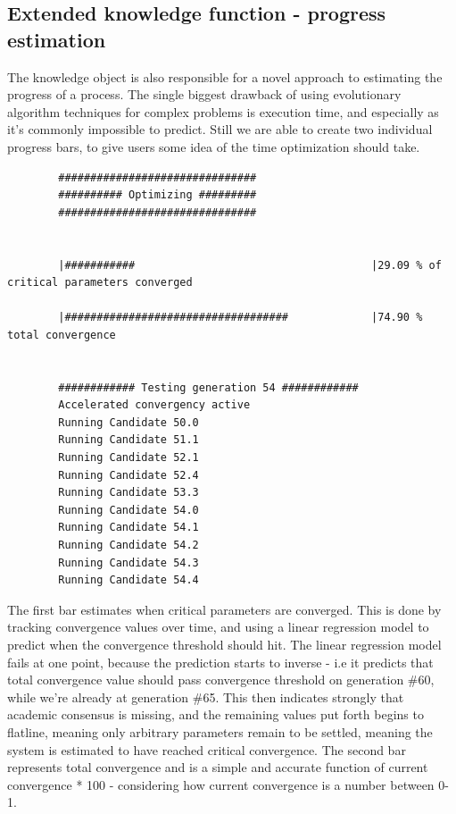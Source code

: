 \documentclass[a4paper,english]{report}
\begin{document}
		\subsection{Extended knowledge function - progress estimation}
		The knowledge object is also responsible for a novel approach to estimating the progress of a process. The single biggest drawback of using evolutionary algorithm techniques for complex problems is execution time, and especially as it's commonly impossible to predict. Still we are able to create two individual progress bars, to give users some idea of the time optimization should take.
		\scriptsize
		\begin{verbatim}
		###############################
		########## Optimizing #########
		###############################
		
		
		|###########                                     |29.09 % of critical parameters converged
		
		|###################################             |74.90 % total convergence
		
		
		############ Testing generation 54 ############
		Accelerated convergency active
		Running Candidate 50.0
		Running Candidate 51.1
		Running Candidate 52.1
		Running Candidate 52.4
		Running Candidate 53.3
		Running Candidate 54.0
		Running Candidate 54.1
		Running Candidate 54.2
		Running Candidate 54.3
		Running Candidate 54.4

		\end{verbatim}
		\normalsize
		The first bar estimates when critical parameters are converged. This is done by tracking convergence values over time, and using a linear regression model to predict when the convergence threshold should hit. The linear regression model fails at one point, because the prediction starts to inverse - i.e it predicts that total convergence value should pass convergence threshold on generation \#60, while we're already at generation \#65. This then indicates strongly that academic consensus is missing, and the remaining values put forth begins to flatline, meaning only arbitrary parameters remain to be settled, meaning the system is estimated to have reached critical convergence. The second bar represents total convergence and is a simple and accurate function of current convergence * 100 - considering how current convergence is a number between 0-1.
\end{document}
